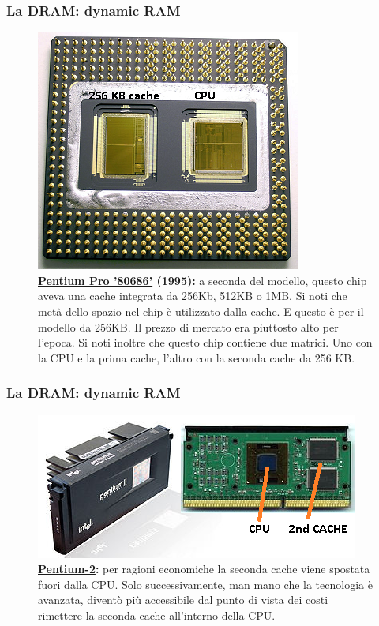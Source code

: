 \begin{frame}
	\frametitle{La DRAM: dynamic RAM}
	 
	\begin{figure}[!htbp] 
		\centering
		\includegraphics[width=0.42\linewidth]{images/5_memory/cache_2.png}
		\caption{\textbf{\href{https://en.wikipedia.org/wiki/Pentium\_Pro}{Pentium Pro '80686'} (1995):} a seconda del modello, questo chip aveva una cache integrata da 256Kb, 512KB o 1MB. Si noti che metà dello spazio nel chip è utilizzato dalla cache. E questo è per il modello da 256KB. Il prezzo di mercato era piuttosto alto per l'epoca. Si noti inoltre che questo chip contiene due matrici. Uno con la CPU e la prima cache, l'altro con la seconda cache da 256 KB.}
	\end{figure}
	
\end{frame}


\begin{frame}
	\frametitle{La DRAM: dynamic RAM}
	 
	\begin{figure}[!htbp] 
		\centering
		\includegraphics[width=0.8\linewidth]{images/5_memory/cache_3.png}
		\caption{\textbf{\href{https://en.wikipedia.org/wiki/Pentium\_Pro}{Pentium-2}:} per ragioni economiche la seconda cache viene spostata fuori dalla CPU. Solo successivamente, man mano che la tecnologia è avanzata, diventò più accessibile dal punto di vista dei costi rimettere la seconda cache all'interno della CPU.}
	\end{figure}
	
\end{frame}



